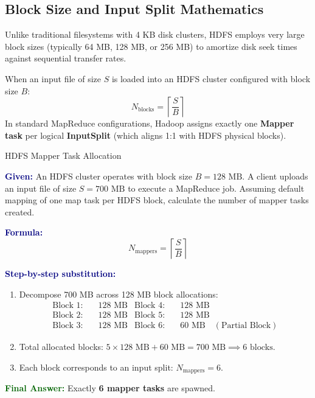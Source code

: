\documentclass[11pt,a4paper,openany]{report}
\newcommand{\Given}{\par\textbf{\textcolor{navy}{Given:}} }
\newcommand{\Formula}{\par\textbf{\textcolor{navy}{Formula:}} }
\newcommand{\Steps}{\par\textbf{\textcolor{navy}{Step-by-step substitution:}}\par}
\newcommand{\Answer}{\par\textbf{\textcolor{darkgreen}{Final Answer:}} }
\begin{document}
\subsection{Block Size and Input Split Mathematics}
Unlike traditional filesystems with 4 KB disk clusters, HDFS employs very large block sizes (typically 64 MB, 128 MB, or 256 MB) to amortize disk seek times against sequential transfer rates.

When an input file of size $S$ is loaded into an HDFS cluster configured with block size $B$:
\begin{equation}
N_{\text{blocks}} = \left\lceil \frac{S}{B} \right\rceil
\end{equation}
In standard MapReduce configurations, Hadoop assigns exactly one \textbf{Mapper task} per logical \textbf{InputSplit} (which aligns 1:1 with HDFS physical blocks).

\begin{solved}{HDFS Mapper Task Allocation}
\Given An HDFS cluster operates with block size $B = 128\text{ MB}$. A client uploads an input file of size $S = 700\text{ MB}$ to execute a MapReduce job. Assuming default mapping of one map task per HDFS block, calculate the number of mapper tasks created.
\Formula
\begin{equation}
N_{\text{mappers}} = \left\lceil \frac{S}{B} \right\rceil
\end{equation}
\Steps
\begin{enumerate}[leftmargin=*]
  \item Decompose 700 MB across 128 MB block allocations:
  \begin{align*}
  \text{Block 1:} & \quad 128\text{ MB} & \text{Block 4:} & \quad 128\text{ MB}\\
  \text{Block 2:} & \quad 128\text{ MB} & \text{Block 5:} & \quad 128\text{ MB}\\
  \text{Block 3:} & \quad 128\text{ MB} & \text{Block 6:} & \quad 60\text{ MB} \quad (\text{Partial Block})
  \end{align*}
  \item Total allocated blocks: $5 \times 128\text{ MB} + 60\text{ MB} = 700\text{ MB} \implies 6\text{ blocks}$.
  \item Each block corresponds to an input split: $N_{\text{mappers}} = 6$.
\end{enumerate}
\Answer Exactly \textbf{6 mapper tasks} are spawned.
\end{solved}
\end{document}
